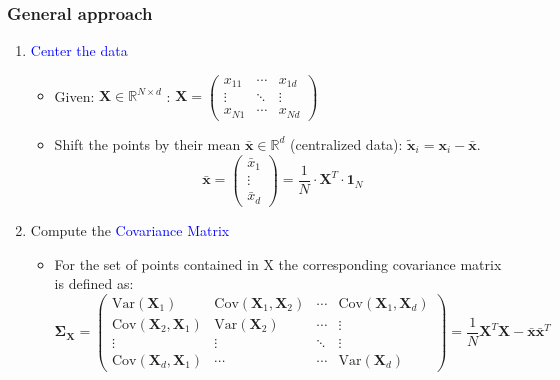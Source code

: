 \documentclass[a4paper,10pt,twoside=true,DIV=10,headsepline,plainheadsepline]{scrartcl}
\begin{document}
		\subsubsection{General approach}
		\begin{enumerate}
			\item \textcolor{blue}{Center the data}
			\begin{itemize}[noitemsep,nolistsep]
				\item Given: $\mathbf{X} \in \mathbb{R}^{N \times d}$ : $\mathbf{X} = \begin{pmatrix}
  						x_{11} & \cdots & x_{1d} \\
  						\vdots & \ddots & \vdots  \\
  						x_{N1} & \cdots & x_{Nd}
 						\end{pmatrix}$
					
				\item Shift the points by their mean $\mathbf{\bar{x}} \in \mathbb{R}^{d}$ (centralized data): $\mathbf{\tilde{x}}_i = \mathbf{x}_i - \mathbf{\bar{x}}$. 
				\begin{equation} 
					\mathbf{\bar{x}} = \begin{pmatrix}
  						\bar{x}_{1} \\
  						\vdots \\
  						\bar{x}_{d} 
 						\end{pmatrix} = \frac{1}{N} \cdot \mathbf{X}^T \cdot \mathbf{1}_N
				\end{equation}
			\end{itemize}

			\item Compute the \textcolor{blue}{Covariance Matrix}
			\begin{itemize}[noitemsep,nolistsep]
				\item For the set of points contained in X the corresponding covariance matrix is defined as:
				\begin{equation} 
					\mathbf{\Sigma}_{\mathbf{X}} = \begin{pmatrix}
  						\textrm{Var}(\mathbf{X}_1) & \textrm{Cov}(\mathbf{X}_1, \mathbf{X}_2) & \cdots & \textrm{Cov}(\mathbf{X}_1, \mathbf{X}_d) \\
  						\textrm{Cov}(\mathbf{X}_2, \mathbf{X}_1) & \textrm{Var}(\mathbf{X}_2) & \cdots & \vdots \\
  						\vdots  & \vdots  & \ddots & \vdots  \\
  						\textrm{Cov}(\mathbf{X}_d, \mathbf{X}_1) & \cdots & \cdots & \textrm{Var}(\mathbf{X}_d)
 						\end{pmatrix} = \frac{1}{N} \mathbf{X}^T \mathbf{X} - \mathbf{\bar{x}} \mathbf{\bar{x}}^T
				\end{equation}
			\end{itemize}


\end{enumerate}
\end{document}

